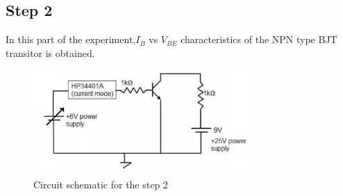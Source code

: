 \documentclass[letterpaper,12pt]{article}
\begin{document}
\subsection{Step 2}
In this part of the experiment,\(I_B\) vs \( V_{BE}\) characteristics of the NPN type BJT transitor is obtained.

\begin{figure}[H]
    \centering
    \includegraphics[width = 0.75\textwidth]{step2.png}
    \caption{Circuit schematic for the step 2}
\end{figure} 
\end{document}
